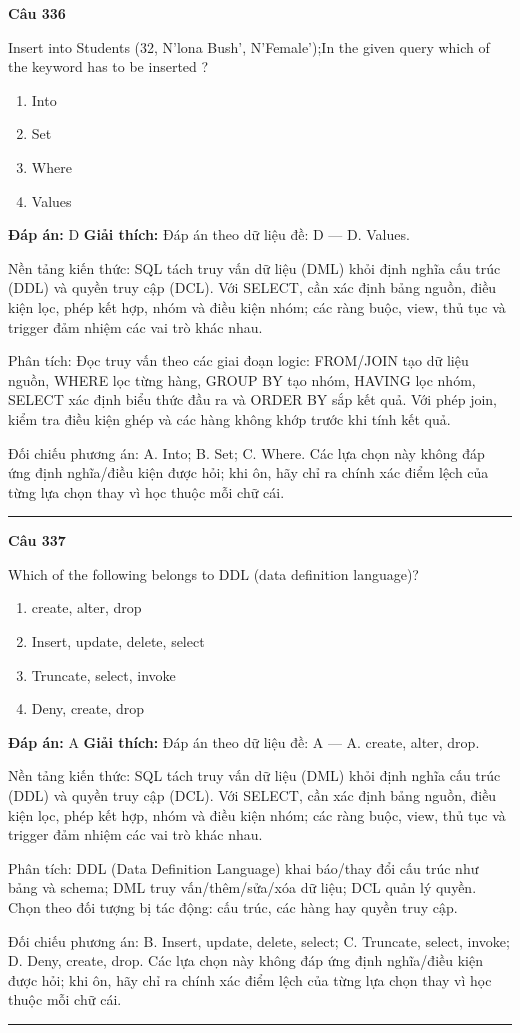 \documentclass[11pt,a4paper]{article}
\newenvironment{question}[1]{%
  \par\vspace{1em}\noindent\textbf{\large Câu #1}\par\vspace{0.4em}
}{%
  \par\vspace{1em}\hrule\vspace{0.6em}
}
\newenvironment{choices}{%
  \begin{enumerate}[label=\textbf{\Alph*.},leftmargin=2.2em,itemsep=2pt,topsep=3pt]
}{%
  \end{enumerate}
}
\newcommand{\choice}{\item}
\begin{document}
\begin{question}{336}
Insert into Students (32, N'lona Bush', N'Female');In the given query which of the keyword has to be inserted ?
\begin{choices}
\choice Into
\choice Set
\choice Where
\choice Values
\end{choices}
\textbf{Đáp án:} D
\textbf{Giải thích:} Đáp án theo dữ liệu đề: D — D. Values.

Nền tảng kiến thức: SQL tách truy vấn dữ liệu (DML) khỏi định nghĩa cấu trúc (DDL) và quyền truy cập (DCL). Với SELECT, cần xác định bảng nguồn, điều kiện lọc, phép kết hợp, nhóm và điều kiện nhóm; các ràng buộc, view, thủ tục và trigger đảm nhiệm các vai trò khác nhau.

Phân tích: Đọc truy vấn theo các giai đoạn logic: FROM/JOIN tạo dữ liệu nguồn, WHERE lọc từng hàng, GROUP BY tạo nhóm, HAVING lọc nhóm, SELECT xác định biểu thức đầu ra và ORDER BY sắp kết quả. Với phép join, kiểm tra điều kiện ghép và các hàng không khớp trước khi tính kết quả.

Đối chiếu phương án: A. Into; B. Set; C. Where. Các lựa chọn này không đáp ứng định nghĩa/điều kiện được hỏi; khi ôn, hãy chỉ ra chính xác điểm lệch của từng lựa chọn thay vì học thuộc mỗi chữ cái.
\end{question}


\begin{question}{337}
Which of the following belongs to DDL (data definition language)?
\begin{choices}
\choice create, alter, drop
\choice Insert, update, delete, select
\choice Truncate, select, invoke
\choice Deny, create, drop
\end{choices}
\textbf{Đáp án:} A
\textbf{Giải thích:} Đáp án theo dữ liệu đề: A — A. create, alter, drop.

Nền tảng kiến thức: SQL tách truy vấn dữ liệu (DML) khỏi định nghĩa cấu trúc (DDL) và quyền truy cập (DCL). Với SELECT, cần xác định bảng nguồn, điều kiện lọc, phép kết hợp, nhóm và điều kiện nhóm; các ràng buộc, view, thủ tục và trigger đảm nhiệm các vai trò khác nhau.

Phân tích: DDL (Data Definition Language) khai báo/thay đổi cấu trúc như bảng và schema; DML truy vấn/thêm/sửa/xóa dữ liệu; DCL quản lý quyền. Chọn theo đối tượng bị tác động: cấu trúc, các hàng hay quyền truy cập.

Đối chiếu phương án: B. Insert, update, delete, select; C. Truncate, select, invoke; D. Deny, create, drop. Các lựa chọn này không đáp ứng định nghĩa/điều kiện được hỏi; khi ôn, hãy chỉ ra chính xác điểm lệch của từng lựa chọn thay vì học thuộc mỗi chữ cái.
\end{question}
\end{document}
